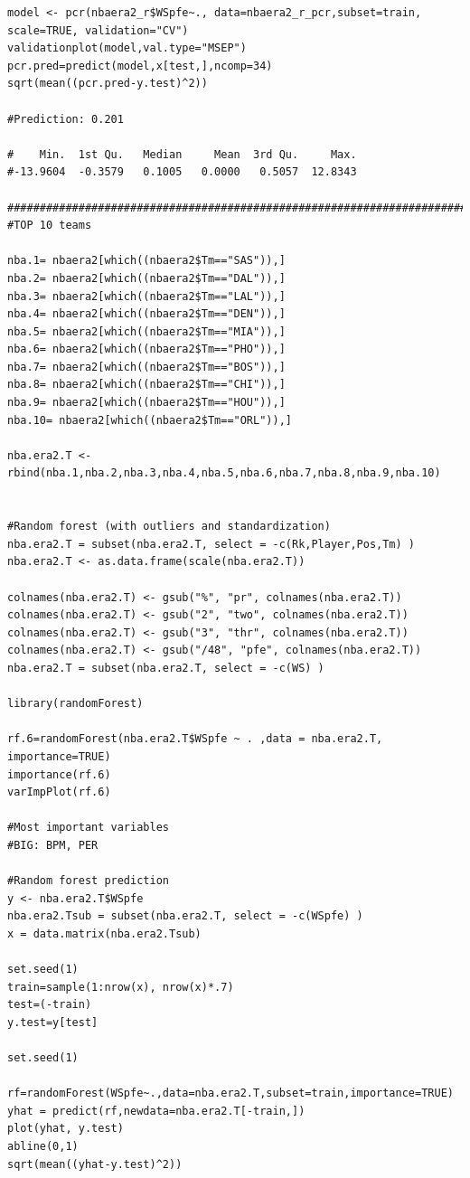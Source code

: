 \documentclass[11pt,letterpaper]{amsart}
\begin{document}
\begin{lstlisting}[breaklines]
model <- pcr(nbaera2_r$WSpfe~., data=nbaera2_r_pcr,subset=train, scale=TRUE, validation="CV")
validationplot(model,val.type="MSEP")
pcr.pred=predict(model,x[test,],ncomp=34)
sqrt(mean((pcr.pred-y.test)^2))

#Prediction: 0.201

#    Min.  1st Qu.   Median     Mean  3rd Qu.     Max. 
#-13.9604  -0.3579   0.1005   0.0000   0.5057  12.8343

####################################################################################
#TOP 10 teams

nba.1= nbaera2[which((nbaera2$Tm=="SAS")),]
nba.2= nbaera2[which((nbaera2$Tm=="DAL")),]
nba.3= nbaera2[which((nbaera2$Tm=="LAL")),]
nba.4= nbaera2[which((nbaera2$Tm=="DEN")),]
nba.5= nbaera2[which((nbaera2$Tm=="MIA")),]
nba.6= nbaera2[which((nbaera2$Tm=="PHO")),]
nba.7= nbaera2[which((nbaera2$Tm=="BOS")),]
nba.8= nbaera2[which((nbaera2$Tm=="CHI")),]
nba.9= nbaera2[which((nbaera2$Tm=="HOU")),]
nba.10= nbaera2[which((nbaera2$Tm=="ORL")),]

nba.era2.T <- rbind(nba.1,nba.2,nba.3,nba.4,nba.5,nba.6,nba.7,nba.8,nba.9,nba.10)


#Random forest (with outliers and standardization)
nba.era2.T = subset(nba.era2.T, select = -c(Rk,Player,Pos,Tm) )
nba.era2.T <- as.data.frame(scale(nba.era2.T))

colnames(nba.era2.T) <- gsub("%", "pr", colnames(nba.era2.T))
colnames(nba.era2.T) <- gsub("2", "two", colnames(nba.era2.T))
colnames(nba.era2.T) <- gsub("3", "thr", colnames(nba.era2.T))
colnames(nba.era2.T) <- gsub("/48", "pfe", colnames(nba.era2.T))
nba.era2.T = subset(nba.era2.T, select = -c(WS) )

library(randomForest)

rf.6=randomForest(nba.era2.T$WSpfe ~ . ,data = nba.era2.T, importance=TRUE)
importance(rf.6)
varImpPlot(rf.6)

#Most important variables 
#BIG: BPM, PER  

#Random forest prediction
y <- nba.era2.T$WSpfe
nba.era2.Tsub = subset(nba.era2.T, select = -c(WSpfe) )
x = data.matrix(nba.era2.Tsub)

set.seed(1)
train=sample(1:nrow(x), nrow(x)*.7)
test=(-train)
y.test=y[test]

set.seed(1)

rf=randomForest(WSpfe~.,data=nba.era2.T,subset=train,importance=TRUE)
yhat = predict(rf,newdata=nba.era2.T[-train,])
plot(yhat, y.test)
abline(0,1)
sqrt(mean((yhat-y.test)^2))


\end{lstlisting}
\end{document}
